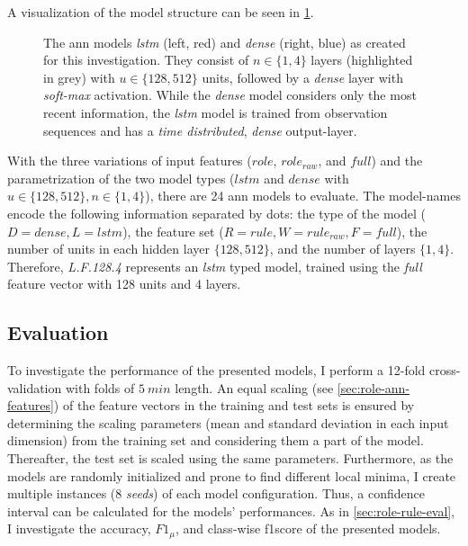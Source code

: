 A visualization of the model structure can be seen in \cref{fig:role-nn-models}.
\begin{figure}[tbh]
    \centering
    \def\svgwidth{1.0\textwidth}
    \begin{footnotesize}
    
    \end{footnotesize}
    \caption[Neural networks for role recognition.]{\label{fig:role-nn-models}
    The \gls{ann} models \emph{lstm} (left, red) and \emph{dense} (right, blue) as created for this investigation.
    They consist of \(n \in \{1,4\}\) layers (highlighted in grey) with \(u \in \{128,512\}\) units, followed by a \emph{dense} layer with \emph{soft-max} activation.
    While the \emph{dense} model considers only the most recent information, the \emph{lstm} model is trained from observation sequences and has a \emph{time distributed}, \emph{dense} output-layer.
    }
\end{figure}
With the three variations of input features (\(role\), \(role_{raw}\), and \(full\)) and the parametrization of the two model types (\(lstm\) and \(dense\) with \(u \in \{128,512\}, n \in \{1,4\}\)), there are 24 \gls{ann} models to evaluate.
The model-names encode the following information separated by dots: the type of the model (\(D = dense, L = lstm\)), the feature set (\(R = rule, W = rule_{raw}, F = full\)), the number of units in each hidden layer \(\{128,512\}\), and the number of layers \(\{1,4\}\).
Therefore, \emph{L.F.128.4} represents an \emph{lstm} typed model, trained using the \emph{full} feature vector with 128 units and 4 layers.

\subsection{Evaluation}

To investigate the performance of the presented models, I perform a 12-fold cross-validation with folds of \(\SI{5}{min}\) length.
An equal scaling (see \cref{sec:role-ann-features}) of the feature vectors in the training and test sets is ensured by determining the scaling parameters (mean and standard deviation in each input dimension) from the training set and considering them a part of the model.
Thereafter, the test set is scaled using the same parameters.
Furthermore, as the models are randomly initialized and prone to find different local minima, I create multiple instances (8 \emph{seeds}) of each model configuration.
Thus, a confidence interval can be calculated for the models' performances.
As in \cref{sec:role-rule-eval}, I investigate the \gls{accuracy}, \(F1_\mu\), and class-wise \gls{f1score} of the presented models.

